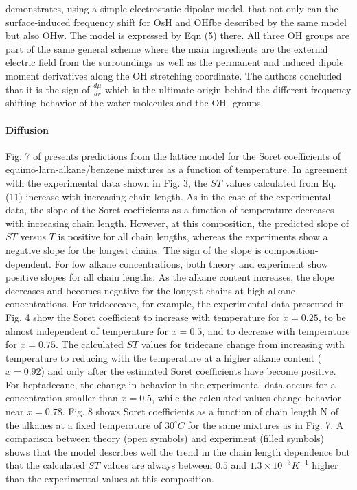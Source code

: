 \documentclass[11pt]{book}
\begin{document}
\cite{kebede2018red} demonstrates, using a simple electrostatic dipolar
model, that not only can the surface-induced frequency shift for OsH
and OHfbe described by the same model but also OHw. The model is expressed
by Eqn (5) there. All three OH groups are part of the same general
scheme where the main ingredients are the external electric field
from the surroundings as well as the permanent and induced dipole
moment derivatives along the OH stretching coordinate. The authors
concluded that it is the sign of $\frac{d\mu}{dr}$ which is the ultimate
origin behind the different frequency shifting behavior of the water
molecules and the OH- groups.


\paragraph{Diffusion}

Fig. 7 of \cite{polyakov2006study} presents predictions from the
lattice model for the Soret coefficients of equimo-larn-alkane/benzene
mixtures as a function of temperature. In agreement with the experimental
data shown in Fig. 3, the $ST$ values calculated from Eq. (11) increase
with increasing chain length. As in the case of the experimental data,
the slope of the Soret coefficients as a function of temperature decreases
with increasing chain length. However, at this composition, the predicted
slope of $ST$ versus $T$ is positive for all chain lengths, whereas
the experiments show a negative slope for the longest chains. The
sign of the slope is composition-dependent. For low alkane concentrations,
both theory and experiment show positive slopes for all chain lengths.
As the alkane content increases, the slope decreases and becomes negative
for the longest chains at high alkane concentrations. For tridececane,
for example, the experimental data presented in Fig. 4 show the Soret
coefficient to increase with temperature for $x=0.25$, to be almost
independent of temperature for $x=0.5$, and to decrease with temperature
for $x=0.75$. The calculated $ST$ values for tridecane change from
increasing with temperature to reducing with the temperature at a
higher alkane content ($x=0.92$) and only after the estimated Soret
coefficients have become positive. For heptadecane, the change in
behavior in the experimental data occurs for a concentration smaller
than $x=0.5$, while the calculated values change behavior near $x=0.78$.
Fig. 8 shows Soret coefficients as a function of chain length N of
the alkanes at a fixed temperature of $30^{\circ}C$ for the same
mixtures as in Fig. 7. A comparison between theory (open symbols)
and experiment (filled symbols) shows that the model describes well
the trend in the chain length dependence but that the calculated $ST$
values are always between $0.5$ and $1.3\times10^{-3}K^{-1}$ higher
than the experimental values at this composition.
\end{document}
